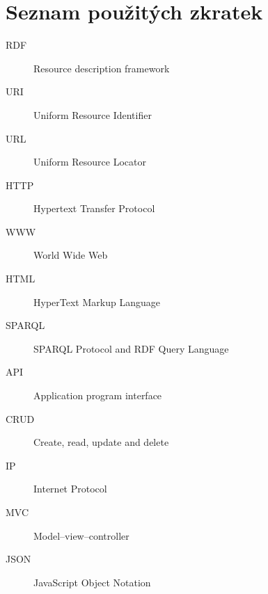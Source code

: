 \documentclass[thesis=B,czech]{FITthesis}[2012/06/26]
\begin{document}
\appendix

\chapter{Seznam použitých zkratek}
\begin{description}
	\item[RDF] Resource description framework
	\item[URI] Uniform Resource Identifier
	\item[URL] Uniform Resource Locator
	\item[HTTP] Hypertext Transfer Protocol
	\item[WWW] World Wide Web
	\item[HTML] HyperText Markup Language
	\item[SPARQL] SPARQL Protocol and RDF Query Language
	\item[API] Application program interface
	\item[CRUD] Create, read, update and delete
	\item[IP] Internet Protocol 
	\item[MVC] Model–view–controller
	\item[JSON] JavaScript Object Notation
\end{description}
\end{document}
